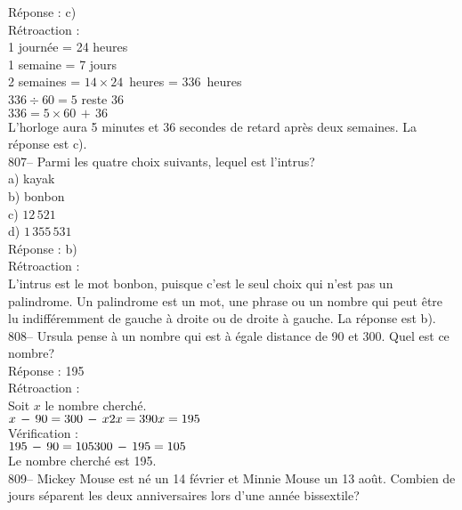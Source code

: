 ﻿\documentclass[letterpaper, 12pt]{article}
\begin{document}
R\'eponse : c)\\

R\'etroaction : \\
1 journ\'ee = 24 heures\\
1 semaine = 7 jours\\
2 semaines = $14\times24$~heures = 336~heures\\
$336\div60=5$ reste 36\\
$336=5\times60\,+\,36$\\
L'horloge aura 5 minutes et 36 secondes de retard apr\`es deux semaines.  La
r\'eponse est c).\\

807-- Parmi les quatre choix suivants, lequel est l'intrus?\\
a) kayak\\
b) bonbon\\
c) $12\,521$\\
d) $1\,355\,531$\\

R\'eponse : b)\\

R\'etroaction : \\
L'intrus est le mot bonbon, puisque c'est le seul choix qui n'est pas un
palindrome.  Un palindrome est un mot, une phrase ou un nombre qui peut
\^etre lu indiff\'eremment de gauche \`a droite ou de droite \`a gauche.  La
r\'eponse est b).\\

808-- Ursula pense \`a un nombre qui est \`a \'egale distance de 90 et 300.
Quel est ce nombre?\\

R\'eponse : 195\\

R\'etroaction : \\
Soit $x$ le nombre cherch\'e.\\

$x\,-\,90=300\,-\,x\\
2x=390\\
x=195$\\

V\'erification : \\
$195\,-\,90=105\\
300\,-\,195=105$\\

Le nombre cherch\'e est 195.\\

809-- Mickey Mouse est n\'e un 14 f\'evrier et Minnie Mouse un 13 ao\^ut.
Combien de jours s\'eparent les deux anniversaires lors d'une ann\'ee
bissextile?\\
\end{document}
